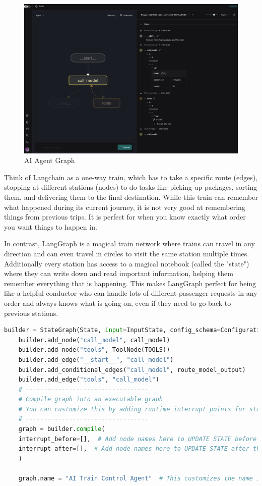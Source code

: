 \begin{figure}[H]
    \centering
    \label{fig:graph}
    \includegraphics[width=\textwidth]{docs/agent_graph.png}
    \caption{AI Agent Graph}
\end{figure}

Think of Langchain as a one-way train, which has to take a specific route (edges), stopping at different stations (nodes) to do tasks like picking up packages, sorting them, and delivering them to the final destination. While this train can remember what happened during its current journey, it is not very good at remembering things from previous trips. It is perfect for when you know exactly what order you want things to happen in. 

In contrast, LangGraph is a magical train network where trains can travel in any direction and can even travel in circles to visit the same station multiple times. Additionally every station has access to a magical notebook (called the "state") where they can write down and read important information, helping them remember everything that is happening. This makes LangGraph perfect for being like a helpful conductor who can handle lots of different passenger requests in any order and always knows what is going on, even if they need to go back to previous stations.

\begin{lstlisting}[language=Python, caption=AI Controller - Graph Flow]
    builder = StateGraph(State, input=InputState, config_schema=Configuration)
    builder.add_node("call_model", call_model)
    builder.add_node("tools", ToolNode(TOOLS))
    builder.add_edge("__start__", "call_model")
    builder.add_conditional_edges("call_model", route_model_output)
    builder.add_edge("tools", "call_model")
    # ----------------------------------
    # Compile graph into an executable graph
    # You can customize this by adding runtime interrupt points for state updates
    # ----------------------------------
    graph = builder.compile(
    interrupt_before=[],  # Add node names here to UPDATE STATE before they're called
    interrupt_after=[],  # Add node names here to UPDATE STATE after they're called
    )

    graph.name = "AI Train Control Agent"  # This customizes the name in LangSmith for Tracking
\end{lstlisting}


